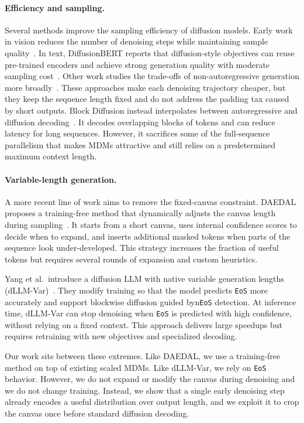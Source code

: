 \documentclass{article}
\theoremstyle{plain}
\theoremstyle{definition}
\theoremstyle{remark}
\begin{document}
\paragraph{Efficiency and sampling.} Several methods improve the sampling efficiency of diffusion models. Early work in vision reduces the number of denoising steps while maintaining sample quality~\citep{Ho2020DDPM}.
In text, DiffusionBERT reports that diffusion-style objectives can reuse pre-trained encoders and achieve strong generation quality with moderate sampling cost~\citep{He2022}.
Other work studies the trade-offs of non-autoregressive generation more broadly~\citep{DBLP:journals/corr/abs-2004-10454}.
These approaches make each denoising trajectory cheaper, but they keep the sequence length fixed and do not address the padding tax caused by short outputs.
Block Diffusion instead interpolates between autoregressive and diffusion decoding~\citep{Arriola2025}.
It decodes overlapping blocks of tokens and can reduce latency for long sequences.
However, it sacrifices some of the full-sequence parallelism that makes MDMs attractive and still relies on a predetermined maximum context length.

\paragraph{Variable-length generation.} A more recent line of work aims to remove the fixed-canvas constraint.
DAEDAL proposes a training-free method that dynamically adjusts the canvas length during sampling~\citep{li2025fixedtrainingfreevariablelengthdenoising}.
It starts from a short canvas, uses internal confidence scores to decide when to expand, and inserts additional masked tokens when parts of the sequence look under-developed.
This strategy increases the fraction of useful tokens but requires several rounds of expansion and custom heuristics.

Yang et al.\ introduce a diffusion LLM with native variable generation lengths (dLLM-Var)~\citep{yang2025diffusionllmnativevariable}.
They modify training so that the model predicts \texttt{EoS} more accurately and support blockwise diffusion guided byn\texttt{EoS} detection. At inference time, dLLM-Var can stop denoising when \texttt{EoS} is predicted with high confidence, without relying on a fixed context. This approach delivers large speedups but requires retraining with new objectives and specialized decoding.

Our work sits between these extremes.
Like DAEDAL, we use a training-free method on top of existing scaled MDMs.
Like dLLM-Var, we rely on \texttt{EoS} behavior.
However, we do not expand or modify the canvas during denoising and we do not change training.
Instead, we show that a single early denoising step already encodes a useful distribution over output length, and we exploit it to crop the canvas once before standard diffusion decoding.
\end{document}
